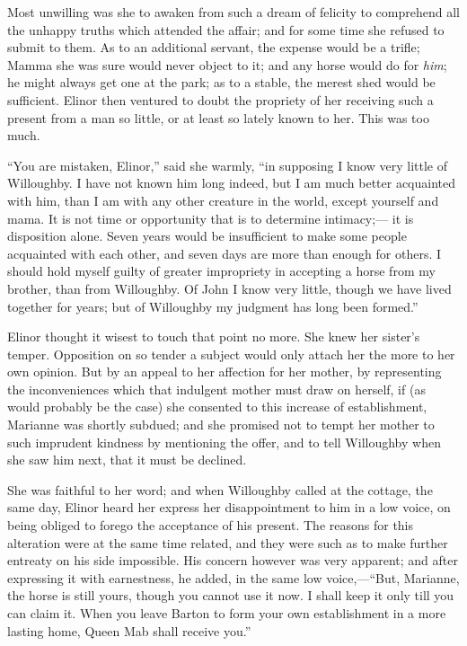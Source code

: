 \documentclass{article}
\begin{document}
Most unwilling was she to awaken from such a dream of
felicity to comprehend all the unhappy truths which attended
the affair; and for some time she refused to submit to them.
As to an additional servant, the expense would be a trifle;
Mamma she was sure would never object to it; and any horse
would do for \emph{him}; he might always get one at the park;
as to a stable, the merest shed would be sufficient.
Elinor then ventured to doubt the propriety of her receiving
such a present from a man so little, or at least so lately
known to her.  This was too much.

``You are mistaken, Elinor,'' said she warmly,
``in supposing I know very little of Willoughby.
I have not known him long indeed, but I am much better
acquainted with him, than I am with any other creature
in the world, except yourself and mama.  It is not
time or opportunity that is to determine intimacy;---%
it is disposition alone.  Seven years would be insufficient
to make some people acquainted with each other, and seven
days are more than enough for others.  I should hold
myself guilty of greater impropriety in accepting a horse
from my brother, than from Willoughby.  Of John I know
very little, though we have lived together for years;
but of Willoughby my judgment has long been formed.''

Elinor thought it wisest to touch that point no more.
She knew her sister's temper.  Opposition on so tender a
subject would only attach her the more to her own opinion.
But by an appeal to her affection for her mother,
by representing the inconveniences which that indulgent
mother must draw on herself, if (as would probably be
the case) she consented to this increase of establishment,
Marianne was shortly subdued; and she promised not to
tempt her mother to such imprudent kindness by mentioning
the offer, and to tell Willoughby when she saw him next,
that it must be declined.

She was faithful to her word; and when Willoughby
called at the cottage, the same day, Elinor heard her
express her disappointment to him in a low voice, on
being obliged to forego the acceptance of his present.
The reasons for this alteration were at the same time related,
and they were such as to make further entreaty on his
side impossible.  His concern however was very apparent;
and after expressing it with earnestness, he added,
in the same low voice,---``But, Marianne, the horse is
still yours, though you cannot use it now.  I shall keep
it only till you can claim it.  When you leave Barton
to form your own establishment in a more lasting home,
Queen Mab shall receive you.''
\end{document}
